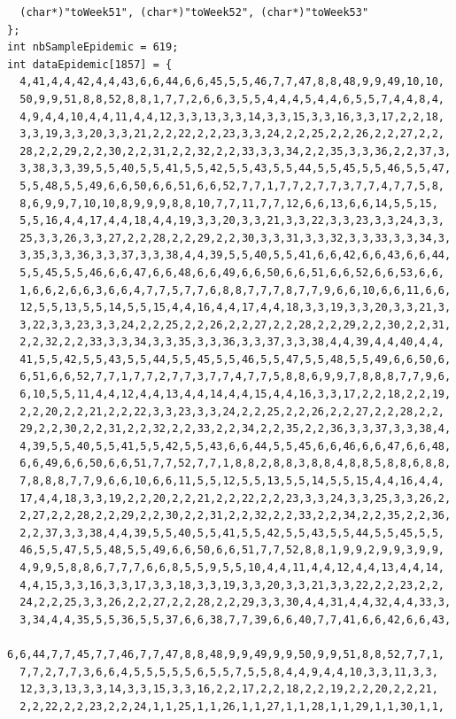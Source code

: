 \documentclass[12pt, a4paper]{article}
\begin{document}
\begin{scriptsize}
\begin{ttfamily}
\begin{lstlisting}
  (char*)"toWeek51", (char*)"toWeek52", (char*)"toWeek53"
};
int nbSampleEpidemic = 619;
int dataEpidemic[1857] = {
  4,41,4,4,42,4,4,43,6,6,44,6,6,45,5,5,46,7,7,47,8,8,48,9,9,49,10,10,
  50,9,9,51,8,8,52,8,8,1,7,7,2,6,6,3,5,5,4,4,4,5,4,4,6,5,5,7,4,4,8,4,
  4,9,4,4,10,4,4,11,4,4,12,3,3,13,3,3,14,3,3,15,3,3,16,3,3,17,2,2,18,
  3,3,19,3,3,20,3,3,21,2,2,22,2,2,23,3,3,24,2,2,25,2,2,26,2,2,27,2,2,
  28,2,2,29,2,2,30,2,2,31,2,2,32,2,2,33,3,3,34,2,2,35,3,3,36,2,2,37,3,
  3,38,3,3,39,5,5,40,5,5,41,5,5,42,5,5,43,5,5,44,5,5,45,5,5,46,5,5,47,
  5,5,48,5,5,49,6,6,50,6,6,51,6,6,52,7,7,1,7,7,2,7,7,3,7,7,4,7,7,5,8,
  8,6,9,9,7,10,10,8,9,9,9,8,8,10,7,7,11,7,7,12,6,6,13,6,6,14,5,5,15,
  5,5,16,4,4,17,4,4,18,4,4,19,3,3,20,3,3,21,3,3,22,3,3,23,3,3,24,3,3,
  25,3,3,26,3,3,27,2,2,28,2,2,29,2,2,30,3,3,31,3,3,32,3,3,33,3,3,34,3,
  3,35,3,3,36,3,3,37,3,3,38,4,4,39,5,5,40,5,5,41,6,6,42,6,6,43,6,6,44,
  5,5,45,5,5,46,6,6,47,6,6,48,6,6,49,6,6,50,6,6,51,6,6,52,6,6,53,6,6,
  1,6,6,2,6,6,3,6,6,4,7,7,5,7,7,6,8,8,7,7,7,8,7,7,9,6,6,10,6,6,11,6,6,
  12,5,5,13,5,5,14,5,5,15,4,4,16,4,4,17,4,4,18,3,3,19,3,3,20,3,3,21,3,
  3,22,3,3,23,3,3,24,2,2,25,2,2,26,2,2,27,2,2,28,2,2,29,2,2,30,2,2,31,
  2,2,32,2,2,33,3,3,34,3,3,35,3,3,36,3,3,37,3,3,38,4,4,39,4,4,40,4,4,
  41,5,5,42,5,5,43,5,5,44,5,5,45,5,5,46,5,5,47,5,5,48,5,5,49,6,6,50,6,
  6,51,6,6,52,7,7,1,7,7,2,7,7,3,7,7,4,7,7,5,8,8,6,9,9,7,8,8,8,7,7,9,6,
  6,10,5,5,11,4,4,12,4,4,13,4,4,14,4,4,15,4,4,16,3,3,17,2,2,18,2,2,19,
  2,2,20,2,2,21,2,2,22,3,3,23,3,3,24,2,2,25,2,2,26,2,2,27,2,2,28,2,2,
  29,2,2,30,2,2,31,2,2,32,2,2,33,2,2,34,2,2,35,2,2,36,3,3,37,3,3,38,4,
  4,39,5,5,40,5,5,41,5,5,42,5,5,43,6,6,44,5,5,45,6,6,46,6,6,47,6,6,48,
  6,6,49,6,6,50,6,6,51,7,7,52,7,7,1,8,8,2,8,8,3,8,8,4,8,8,5,8,8,6,8,8,
  7,8,8,8,7,7,9,6,6,10,6,6,11,5,5,12,5,5,13,5,5,14,5,5,15,4,4,16,4,4,
  17,4,4,18,3,3,19,2,2,20,2,2,21,2,2,22,2,2,23,3,3,24,3,3,25,3,3,26,2,
  2,27,2,2,28,2,2,29,2,2,30,2,2,31,2,2,32,2,2,33,2,2,34,2,2,35,2,2,36,
  2,2,37,3,3,38,4,4,39,5,5,40,5,5,41,5,5,42,5,5,43,5,5,44,5,5,45,5,5,
  46,5,5,47,5,5,48,5,5,49,6,6,50,6,6,51,7,7,52,8,8,1,9,9,2,9,9,3,9,9,
  4,9,9,5,8,8,6,7,7,7,6,6,8,5,5,9,5,5,10,4,4,11,4,4,12,4,4,13,4,4,14,
  4,4,15,3,3,16,3,3,17,3,3,18,3,3,19,3,3,20,3,3,21,3,3,22,2,2,23,2,2,
  24,2,2,25,3,3,26,2,2,27,2,2,28,2,2,29,3,3,30,4,4,31,4,4,32,4,4,33,3,
  3,34,4,4,35,5,5,36,5,5,37,6,6,38,7,7,39,6,6,40,7,7,41,6,6,42,6,6,43,
  6,6,44,7,7,45,7,7,46,7,7,47,8,8,48,9,9,49,9,9,50,9,9,51,8,8,52,7,7,1,
  7,7,2,7,7,3,6,6,4,5,5,5,5,5,6,5,5,7,5,5,8,4,4,9,4,4,10,3,3,11,3,3,
  12,3,3,13,3,3,14,3,3,15,3,3,16,2,2,17,2,2,18,2,2,19,2,2,20,2,2,21,
  2,2,22,2,2,23,2,2,24,1,1,25,1,1,26,1,1,27,1,1,28,1,1,29,1,1,30,1,1,

\end{lstlisting}
\end{ttfamily}
\end{scriptsize}
\end{document}
